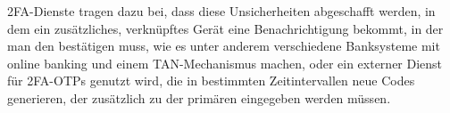 \ac{2FA}-Dienste tragen dazu bei, dass diese Unsicherheiten abgeschafft werden, in dem \zbol ein zusätzliches, verknüpftes Gerät eine Benachrichtigung bekommt, in der man den  bestätigen muss, wie es unter anderem verschiedene Banksysteme mit online banking und einem TAN-Mechanismus machen, oder ein externer Dienst für \ac{2FA}-\acp{OTP} genutzt wird, die in bestimmten Zeitintervallen neue Codes generieren, der zusätzlich zu der primären  eingegeben werden müssen.